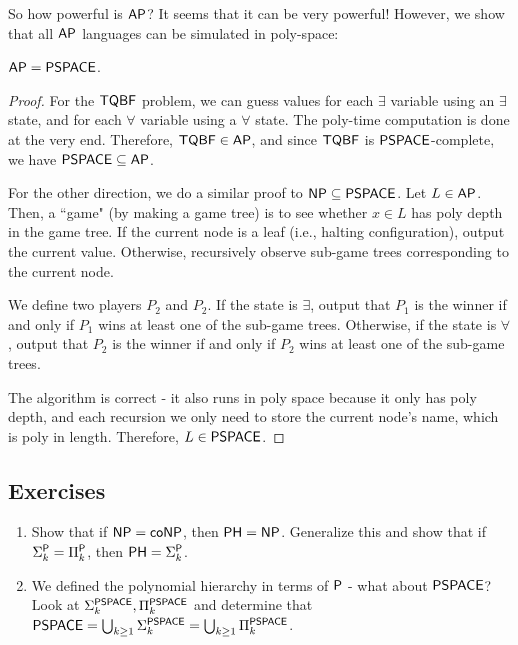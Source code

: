 So how powerful is $\AP$? It seems that it can be very powerful! However, we show that all $\AP$ languages can be simulated in poly-space:
\begin{theorem}
$\AP = \PSPACE$.
\end{theorem}

\begin{proof}
For the $\TQBF$ problem, we can guess values for each $\exists$ variable using an $\exists$ state, and for each $\forall$ variable using a $\forall$ state. The poly-time computation is done at the very end. Therefore, $\TQBF \in \AP$, and since $\TQBF$ is $\PSPACE$-complete, we have $\PSPACE \subseteq \AP$.

\par For the other direction, we do a similar proof to $\NP \subseteq \PSPACE$. Let $L \in \AP$. Then, a ``game" (by making a game tree) is to see whether $x \in L$ has poly depth in the game tree. If the current node is a leaf (i.e., halting configuration), output the current value. Otherwise, recursively observe sub-game trees corresponding to the current node. 

\par We define two players $P_2$ and $P_2$. If the state is $\exists$, output that $P_1$ is the winner if and only if $P_1$ wins at least one of the sub-game trees. Otherwise, if the state is $\forall$, output that $P_2$ is the winner if and only if $P_2$ wins at least one of the sub-game trees. 

\par The algorithm is correct - it also runs in poly space because it only has poly depth, and each recursion we only need to store the current node's name, which is poly in length. Therefore, $L \in \PSPACE$.
\end{proof}

\subsection{Exercises}
\begin{enumerate}

\item Show that if $\NP = \coNP$, then $\PH = \NP$. Generalize this and show that if $\Sigma_k^\P = \Pi_k^\P$, then $\PH = \Sigma_k^\P$. %

\item We defined the polynomial hierarchy in terms of $\P$ - what about $\PSPACE$? Look at $\Sigma_k^\PSPACE, \Pi_k^\PSPACE$ and determine that $\PSPACE = \bigcup_{k \ge 1} \Sigma_k^\PSPACE = \bigcup_{k \ge 1} \Pi_k^\PSPACE$.
\end{enumerate}
